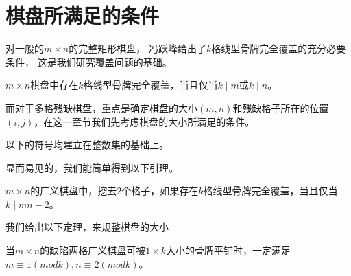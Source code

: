\chapter{棋盘所满足的条件}
\label{cha:sysu-thesis-contents-format-requirement}
对一般的$m \times n$的完整矩形棋盘， 冯跃峰给出了$k$格线型骨牌完全覆盖的充分必要条件， 这是我们研究覆盖问题的基础。

\begin{lemma}
    \label{basic-lemma-1}
    $m \times n$棋盘中存在$k$格线型骨牌完全覆盖，当且仅当$k \mid m$或$k \mid n$。
\end{lemma}

而对于多格残缺棋盘，重点是确定棋盘的大小$(m, n)$和残缺格子所在的位置$(i, j)$，在这一章节我们先考虑棋盘的大小所满足的条件。

以下的符号均建立在整数集的基础上。

显而易见的，我们能简单得到以下引理。
\begin{lemma}
    \label{basic-lemma-2}
    $m \times n$的广义棋盘中，挖去2个格子，如果存在$k$格线型骨牌完全覆盖，当且仅当$k \mid mn-2$。
\end{lemma}

我们给出以下定理，来规整棋盘的大小
\begin{theorem}
    \label{basic-theorem-1}
    当$m \times n$的缺陷两格广义棋盘可被$1 \times k$大小的骨牌平铺时，一定满足$m \equiv 1 (mod k), n \equiv 2 (mod k)$。
\end{theorem}


